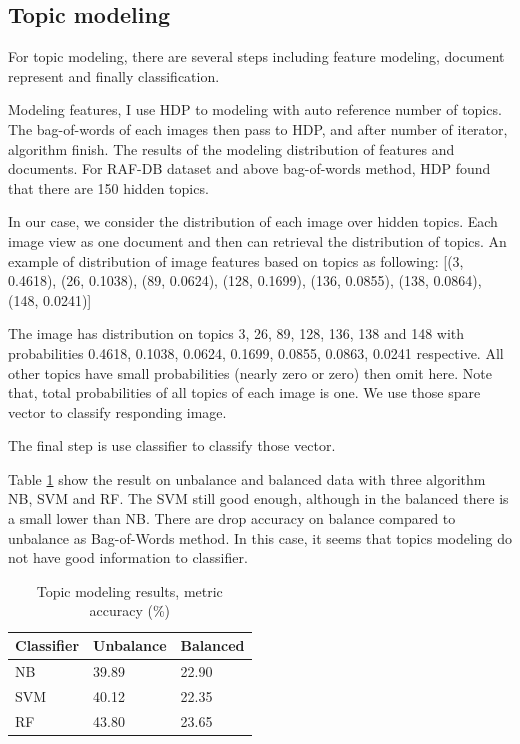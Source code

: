 \documentclass[12pt]{article}
\begin{document}
       
\subsection{Topic modeling}       
       
For topic modeling, there are several steps including feature modeling, document represent and finally classification.

Modeling features, I use HDP \cite{teh2005sharing} to modeling with auto reference number of topics.
The bag-of-words of each images then pass to HDP, and after number of iterator, algorithm finish.
The results of the modeling distribution of features and documents.
For RAF-DB dataset and above bag-of-words method, HDP found that there are 150 hidden topics.

In our case, we consider the distribution of each image over hidden topics.
Each image view as one document and then can retrieval the distribution of topics.
An example of distribution of image features based on topics as following: 
[(3, 0.4618), 
  (26, 0.1038),
  (89, 0.0624),
  (128, 0.1699),
  (136, 0.0855),
  (138, 0.0864),
  (148, 0.0241)]
  



The image has distribution on topics 3, 26, 89, 128, 136, 138 and 148 with probabilities 0.4618, 0.1038, 0.0624, 0.1699, 0.0855, 0.0863, 0.0241 respective.
All other topics have small probabilities (nearly zero or zero) then omit here.
Note that, total probabilities of all topics of each image is one.
We use those spare vector to classify responding image.

The final step is use classifier to classify those vector.

Table \ref{tbl:topic-modeling-metric} show the result on unbalance and balanced data with three algorithm NB, SVM and RF.
The SVM still good enough, although in the balanced there is a small lower than NB.
There are drop accuracy on balance compared to unbalance as Bag-of-Words method.
In this case, it seems that topics modeling do not have good information to classifier.

\begin{table}[h!]
\centering
\caption{Topic modeling results, metric accuracy (\%)} \label{tbl:topic-modeling-metric}
\begin{tabular}{|l|l|l|}
\hline
Classifier & Unbalance & Balanced \\ \hline
NB & 39.89 & 22.90 \\ \hline
SVM & 40.12 & 22.35 \\ \hline
RF & 43.80 & 23.65 \\ \hline
\end{tabular}
\end{table}
\end{document}
